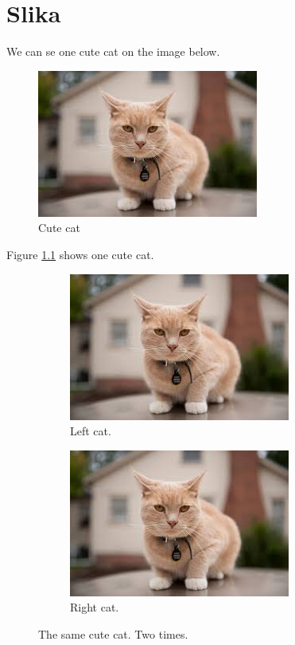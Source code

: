 \chapter{Slika}
We can se one cute cat on the image below.
\begin{figure}[ht!]
  \centering
  \includegraphics{images/cat.jpg}
  \caption{Cute cat}
  \label{fig:cute_cat}
\end{figure}

Figure \ref{fig:cute_cat} shows one cute cat.

\begin{figure}[ht!]
  \centering
  \begin{subfigure}[b]{0.4\linewidth}
    \includegraphics[width=\linewidth]{images/cat.jpg}
    \caption{Left cat.}
  \end{subfigure}
  \begin{subfigure}[b]{0.4\linewidth}
    \includegraphics[width=\linewidth]{images/cat.jpg}
    \caption{Right cat.}
  \end{subfigure}
  \caption{The same cute cat. Two times.}
  \label{fig:two_cats}
\end{figure}


